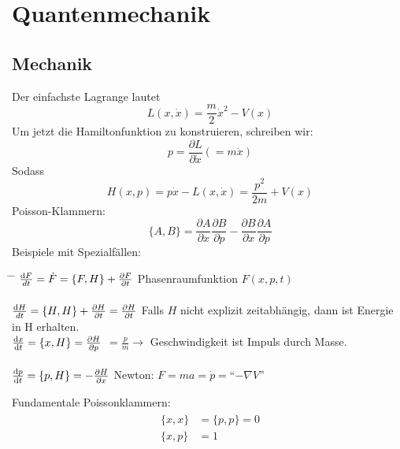 \section{Quantenmechanik} 
	\subsection{Mechanik}
		Der einfachste Lagrange lautet 
			\begin{equation*}
				L (x,\dot{x}) = \frac{m}{2} \dot{x}^2 - V(x) 
			\end{equation*}
		Um jetzt die Hamiltonfunktion zu konstruieren, schreiben wir:
			\begin{equation*}
				p=
				\frac{\partial L}{\partial \dot{x}}
				(=m \dot{x})
			\end{equation*}
		Sodass
			\begin{equation*}
				H(x,p)= 
				p \dot{x} - L(x,\dot{x}) = 
				\frac{p^2}{2m} + V(x)
			\end{equation*}
		Poisson-Klammern:
			\begin{equation*}
				\{A,B\}=
				\frac{\partial A}{\partial x} \frac{\partial B}{\partial p}
				- \frac{\partial B}{\partial x} \frac{\partial A}{\partial p}
			\end{equation*}
		Beispiele mit Spezialfällen:
		\begin{tabbing}
			\hspace{0.4\linewidth} \= \hspace{0.6\linewidth} \= \hfill \kill
			$\frac{\mathrm{d} F}{dt} = \dot{F} = \{F,H\} + \frac{\partial F}{\partial t}$ \> 
			Phasenraumfunktion $F(x,p,t)$ \\ \\
			$\frac{\mathrm{d} H}{dt} = \{H,H\} + \frac{\partial H}{\partial t} = \frac{\partial H}{\partial t}$ \>
			Falls $H$ nicht explizit zeitabhängig, dann ist Energie \\
			\hfill \>  in H erhalten. \\  %
			$\frac{\mathrm{d} x}{\mathrm{d} t} = \{x,H\} = \frac{\partial H}{\partial p}$ \>
			$=\frac{p}{m} \rightarrow$ Geschwindigkeit ist Impuls durch Masse. \\ \\
			$\frac{\mathrm{d} p}{\mathrm{d} t} = \{p,H\} = -\frac{\partial H}{\partial x}$ \>
			Newton: $F= ma= \dot{p} =$``$- \nabla V$''	
		\end{tabbing}
		Fundamentale Poissonklammern:
			\begin{align*}
				\begin{split}
					\{x,x\} &=\{p,p\}= 0 \\
					\{x,p\} &= 1
				\end{split}
			\end{align*}
